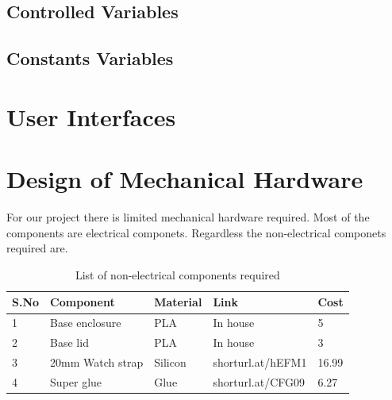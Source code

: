 \documentclass[12pt, titlepage]{article}
\begin{document}
\subsection{Controlled Variables}

\subsection{Constants Variables}

\section{User Interfaces}


\section{Design of Mechanical Hardware}
For our project there is limited mechanical hardware required. Most of the components are electrical componets. Regardless the non-electrical componets required are. 
\begin{table}[H]
\centering
\caption{List of non-electrical components required}
\begin{tabular}{lllll}
S.No & Component        & Material & Link              & Cost  \\ \hline
1    & Base enclosure   & PLA      & In house          & 5     \\
2    & Base lid         & PLA      & In house          & 3     \\
3    & 20mm Watch strap & Silicon  & shorturl.at/hEFM1 & 16.99 \\
4    & Super glue       & Glue     & shorturl.at/CFG09 & 6.27 
\end{tabular}
\label{tab:my-table}
\end{table}
\end{document}

